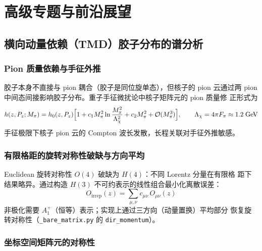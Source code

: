 \documentclass[11pt,a4paper]{ctexart}
\newcommand{\order}[1]{\mathcal{O}(#1)}
\newcommand{\code}[1]{\texttt{#1}}
\begin{document}
\section{高级专题与前沿展望}
\label{sec:frontier}

\subsection{横向动量依赖（TMD）胶子分布的谱分析}

\subsubsection{Pion 质量依赖与手征外推}

胶子本身不直接与 pion 耦合（胶子是同位旋单态），但核子的 pion 云通过两
pion 中间态间接影响胶子分布。重子手征微扰论中核子矩阵元的 pion 质量修
正形式为
\begin{equation}
h(z,P_z;M_\pi) = h_0(z,P_z)\Bigl[1+c_1M_\pi^2
\ln\frac{M_\pi^2}{\Lambda_\chi^2}+c_2M_\pi^2
+\order{M_\pi^3}\Bigr], \qquad \Lambda_\chi=4\pi F_\pi\approx1.2\;
\text{GeV}
\end{equation}
手征极限下核子 pion 云的 Compton 波长发散，长程关联对手征外推敏感。

\subsubsection{有限格距的旋转对称性破缺与方向平均}

Euclidean 旋转对称性 $O(4)$ 破缺为 $H(4)$：不同 Lorentz 分量在有限格
距下结果略异。通过构造 $H(3)$ 不可约表示的线性组合最小化离散误差：
\begin{equation}
O_{\text{irrep}}(z) = \sum_{\mu,\nu} c_{\mu\nu}\,O_{\mu\nu}(z)
\end{equation}
非极化需要 $A_1^+$（恒等）表示；实现上通过三方向（动量置换）平均部分
恢复旋转对称性（\code{\_bare\_matrix.py} 的 \code{dir\_momentum}）。

\subsubsection{坐标空间矩阵元的对称性}
\end{document}
